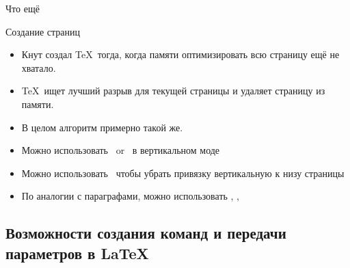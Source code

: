 {\begin{frame}{Что ещё }
\begin{itemize}
    \end{itemize}
     
\end{frame}

\begin{frame}{Создание страниц}\relax
    \begin{itemize}
        \item Кнут создал \TeX\ тогда, когда памяти оптимизировать всю страницу ещё не хватало.
        \item \TeX\ ищет лучший разрыв для текущей страницы и удаляет страницу из памяти.
        \item В целом алгоритм примерно такой же.
        \item Можно использовать \ccol\penalty\ or \ccol\nobreak\ в вертикальном моде
        \item Можно использовать \raggedbottom\ чтобы убрать привязку вертикальную к низу страницы
        \item По аналогии с параграфами, можно использовать \ccol\newpage, \ccol\pagebreak, \ccol\nopagebreak
         
    \end{itemize}
     
\end{frame}
}
\subsection{Возможности создания команд и передачи параметров в \LaTeX}

